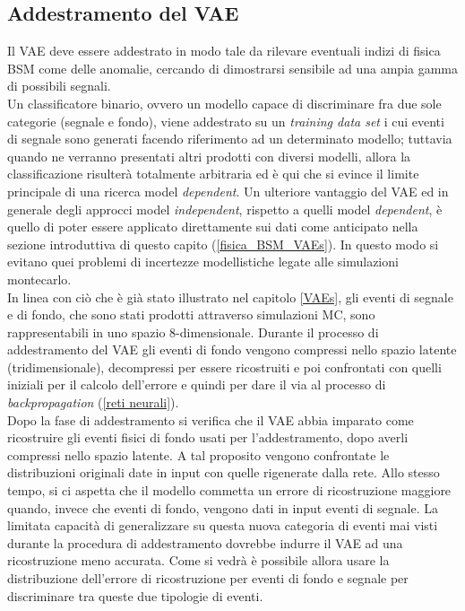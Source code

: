 \subsection{Addestramento del VAE}
\label{simulazione}
Il VAE deve essere addestrato in modo tale da rilevare eventuali indizi di fisica BSM come delle anomalie, cercando di dimostrarsi sensibile ad una ampia gamma di possibili segnali.\\
Un classificatore binario, ovvero un modello capace di discriminare fra due sole categorie (segnale e fondo), viene addestrato su un \textit{training data set} i cui eventi di segnale sono generati facendo riferimento ad un determinato modello; tuttavia quando ne verranno presentati altri prodotti con diversi modelli, allora la classificazione risulterà totalmente arbitraria ed è qui che si evince il limite principale di una ricerca model \textit{dependent}. Un ulteriore vantaggio del VAE ed in generale degli approcci model \textit{independent}, rispetto a quelli model \textit{dependent}, è quello di poter essere applicato direttamente sui dati come anticipato nella sezione introduttiva di questo capito (\ref{fisica_BSM_VAEs}). In questo modo si evitano quei problemi di incertezze modellistiche legate alle simulazioni montecarlo.\\
In linea con ciò che è già stato illustrato nel capitolo \ref{VAEs}, gli eventi di segnale e di fondo, che sono stati prodotti attraverso simulazioni MC, sono rappresentabili in uno spazio 8-dimensionale. Durante il processo di addestramento del VAE gli eventi di fondo vengono compressi nello spazio latente (tridimensionale), decompressi per essere ricostruiti e poi confrontati con quelli iniziali per il calcolo dell'errore e quindi per dare il via al processo di \textit{backpropagation} (\ref{reti neurali}). \\
Dopo la fase di addestramento si verifica che il VAE abbia imparato come ricostruire gli eventi fisici di fondo usati per l'addestramento, dopo averli compressi nello spazio latente. A tal proposito vengono confrontate le distribuzioni originali date in input con quelle rigenerate dalla rete. Allo stesso tempo, si ci aspetta che il modello  commetta un errore di ricostruzione maggiore quando, invece che eventi di fondo, vengono dati in input eventi di segnale. La limitata capacità di generalizzare su questa nuova categoria di eventi mai visti durante la procedura di addestramento dovrebbe indurre il VAE ad una ricostruzione meno accurata. Come si vedrà è possibile allora usare la distribuzione dell'errore di ricostruzione per eventi di fondo e segnale per discriminare tra queste due tipologie di eventi.\\
